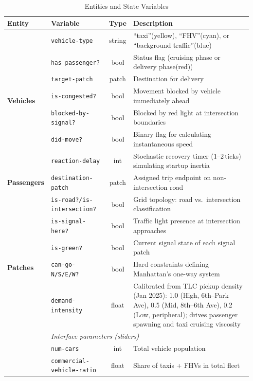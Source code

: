 \documentclass{article}
\begin{document}
\begin{table}[H]
\begin{threeparttable}
\centering
\caption{Entities and State Variables}
\label{tab:entities}
\small 
\begin{tabularx}{\textwidth}{l l c X}
\toprule
\textbf{Entity} & \textbf{Variable} & \textbf{Type} & \textbf{Description} \\
\midrule
\multirow{7}{*}{\textbf{Vehicles}} 
  & \texttt{vehicle-type} & string & ``taxi''(yellow), ``FHV''(cyan), or ``background traffic''(blue) \\
  & \texttt{has-passenger?} & bool & Status flag (cruising phase or delivery phase(red)) \\
  & \texttt{target-patch} & patch & Destination for delivery \\
  & \texttt{is-congested?} & bool & Movement blocked by vehicle immediately ahead \\
  & \texttt{blocked-by-signal?} & bool & Blocked by red light at intersection boundaries \\
  & \texttt{did-move?} & bool & Binary flag for calculating instantaneous speed \\
  & \texttt{reaction-delay} & int & Stochastic recovery timer (1--2\,ticks) simulating startup inertia \\
\midrule
\textbf{Passengers} 
  & \texttt{destination-patch} & patch & Assigned trip endpoint on non-intersection road \\
\midrule
\multirow{6}{*}{\textbf{Patches}} 
  & \texttt{is-road?/is-intersection?} & bool & Grid topology: road vs.\ intersection classification \\
  & \texttt{is-signal-here?} & bool & Traffic light presence at intersection approaches \\
  & \texttt{is-green?} & bool & Current signal state of each signal patch \\
  & \texttt{can-go-N/S/E/W?} & bool & Hard constraints defining Manhattan's one-way system \\
  & \texttt{demand-intensity} & float & Calibrated from TLC pickup density (Jan 2025): 1.0 (High, 6th--Park Ave), 0.5 (Mid, 8th--6th Ave), 0.2 (Low, peripheral); drives passenger spawning and taxi cruising viscosity \\
\midrule
\multirow{12}{*}{\textbf{Global}} 
  & \multicolumn{3}{l}{\textit{Interface parameters (sliders)}} \\
  & \texttt{num-cars} & int & Total vehicle population \\
  & \texttt{commercial-vehicle-ratio} & float & Share of taxis + FHVs in total fleet \\

\end{tabularx}
\end{threeparttable}
\end{table}
\end{document}
